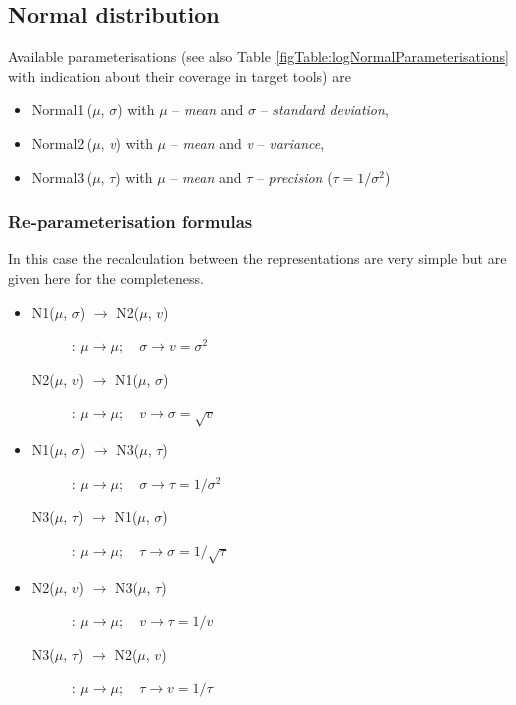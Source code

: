 \subsection{Normal distribution}
Available parameterisations (see also Table \ref{figTable:logNormalParameterisations} 
with indication about their coverage in target tools) are
\begin{itemize}
\item
Normal1\,($\mu$, $\sigma$) with $\mu$ -- \emph{mean} and $\sigma$ -- \emph{standard deviation}, 
\item
Normal2\,($\mu$, \emph{v}) with $\mu$ -- \emph{mean} and \emph{v} -- \emph{variance},
\item
Normal3\,($\mu$, $\tau$) with $\mu$ -- \emph{mean} and $\tau$ -- \emph{precision} ($\tau=1/\sigma^2$)
\end{itemize}

\subsubsection{Re-parameterisation formulas}
In this case the recalculation between the representations are very simple
but are given here for the completeness.
\begin{itemize}
\item 
\begin{description}
\item[N1($\mu$, $\sigma$) $\rightarrow$ N2($\mu$, $v$)]:
$\mu \rightarrow \mu; \quad \sigma \rightarrow v=\sigma^2$

\item[N2($\mu$, $v$) $\rightarrow$ N1($\mu$, $\sigma$)]:
$\mu \rightarrow \mu; \quad v \rightarrow \sigma = \sqrt{v}$
\end{description}

\item 
\begin{description}
\item[N1($\mu$, $\sigma$) $\rightarrow$ N3($\mu$, $\tau$)]:
$\mu \rightarrow \mu; \quad \sigma \rightarrow \tau=1/\sigma^2$

\item[N3($\mu$, $\tau$) $\rightarrow$ N1($\mu$, $\sigma$)]:
$\mu \rightarrow \mu; \quad \tau \rightarrow \sigma=1/\sqrt{\tau}$
\end{description}

\item 
\begin{description}
\item[N2($\mu$, $v$) $\rightarrow$ N3($\mu$, $\tau$)]:
$\mu \rightarrow \mu; \quad v \rightarrow \tau=1/v$

\item[N3($\mu$, $\tau$) $\rightarrow$ N2($\mu$, $v$)]:
$\mu \rightarrow \mu; \quad \tau \rightarrow v=1/\tau$
\end{description}
\end{itemize}

